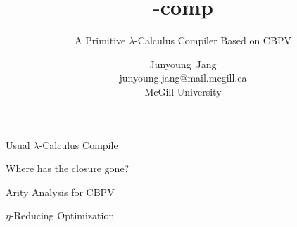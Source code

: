 \documentclass[letterpaper,10pt,aspectratio=169,dvipsnames]{beamer}
\title[\texorpdfstring{\(\lambda\)-comp}{lambdacomp}: A Primitive \texorpdfstring{\(\lambda\)-Calculus}{Lambda Calculus} Compiler Based on CBPV]{\lambda-comp}
\subtitle{A Primitive \(\lambda\)-Calculus Compiler Based on CBPV}
\author[Junyoung Jang]{\parbox{10em}{\centering Junyoung~Jang\\{}{\scriptsize junyoung.jang@mail.mcgill.ca}\\{}{\scriptsize McGill University}}}
\date{}
\begin{document}
\begin{frame}[plain]
  \titlepage
\end{frame}

\begin{frame}{Usual \(\lambda\)-Calculus Compile}
\end{frame}

\begin{frame}{Where has the closure gone?}
\end{frame}

\begin{frame}{Arity Analysis for CBPV}
\end{frame}

\begin{frame}{\(\eta\)-Reducing Optimization}
\end{frame}
\end{document}
